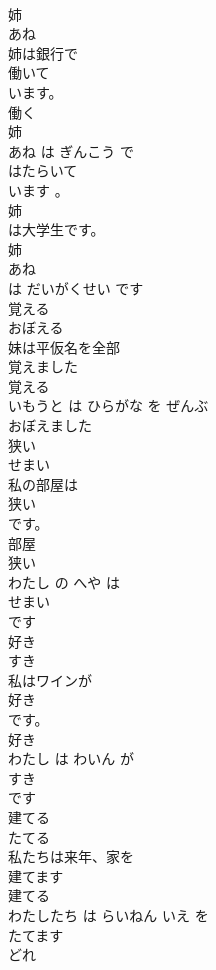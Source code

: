 \documentclass[8pt]{extreport}
\begin{document}
\begin{CJK}{UTF8}{min}
\\	姉	
\\	あね	
\\	姉は銀行で
\\	働いて
\\	います。	
\\	働く 
\\	姉 
\\	あね は ぎんこう で 
\\	はたらいて
\\	います 。	
\\	姉
\\	は大学生です。	
\\	姉 
\\	あね
\\	は だいがくせい です	
\\	覚える	
\\	おぼえる	
\\	妹は平仮名を全部
\\	覚えました
\\	覚える 
\\	いもうと は ひらがな を ぜんぶ 
\\	おぼえました
\\	狭い	
\\	せまい	
\\	私の部屋は
\\	狭い
\\	です。	
\\	部屋 
\\	狭い 
\\	わたし の へや は 
\\	せまい
\\	です	
\\	好き	
\\	すき	
\\	私はワインが
\\	好き
\\	です。	
\\	好き 
\\	わたし は わいん が 
\\	すき
\\	です	
\\	建てる	
\\	たてる	
\\	私たちは来年、家を
\\	建てます
\\	建てる 
\\	わたしたち は らいねん いえ を 
\\	たてます
\\	どれ	

\end{CJK}
\end{document}
